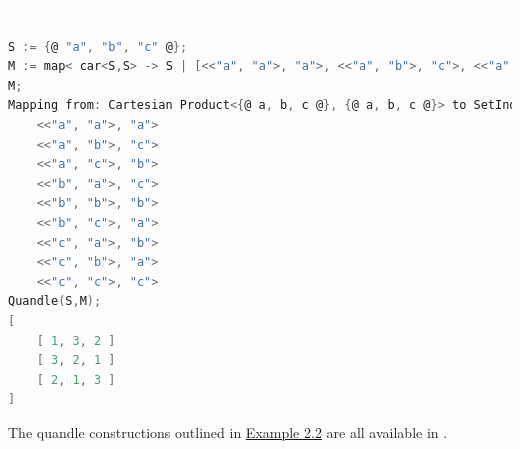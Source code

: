 \begin{example}
\textcolor{white}{skip}\newline
\begin{lstlisting}[language=C]
S := {@ "a", "b", "c" @};
M := map< car<S,S> -> S | [<<"a", "a">, "a">, <<"a", "b">, "c">, <<"a","c">,"b">, <<"b","a">, "c">, <<"b","b">, "b">, <<"b", "c">, "a">, <<"c", "a">, "b"> >, <<"c","b">, "a">, <<"c","c">, "c">]>;
M;
Mapping from: Cartesian Product<{@ a, b, c @}, {@ a, b, c @}> to SetIndx: S
    <<"a", "a">, "a">
    <<"a", "b">, "c">
    <<"a", "c">, "b">
    <<"b", "a">, "c">
    <<"b", "b">, "b">
    <<"b", "c">, "a">
    <<"c", "a">, "b">
    <<"c", "b">, "a">
    <<"c", "c">, "c">
Quandle(S,M);
[ 
    [ 1, 3, 2 ]
    [ 3, 2, 1 ]
    [ 2, 1, 3 ]
]
\end{lstlisting}
\end{example}
\newpage
\noindent The quandle constructions outlined in \hyperref[quandleConst]{Example 2.2} are all available in \Software.
